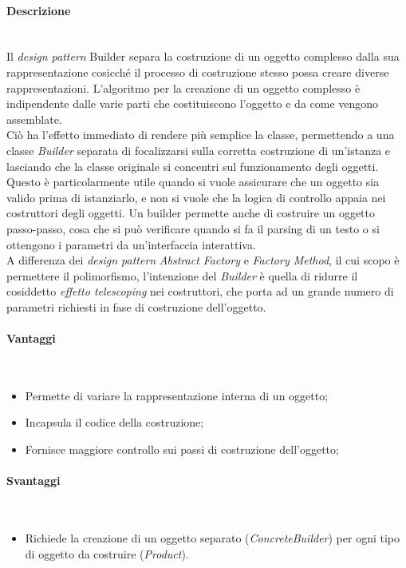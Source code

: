 \paragraph{Descrizione} \mbox{} \\
Il \textit{design pattern} Builder separa la costruzione di un oggetto complesso dalla sua rappresentazione cosicché il processo di costruzione stesso possa creare diverse rappresentazioni. L'algoritmo per la creazione di un oggetto complesso è indipendente dalle varie parti che costituiscono l'oggetto e da come vengono assemblate. \\
Ciò ha l'effetto immediato di rendere più semplice la classe, permettendo a una classe \textit{Builder} separata di focalizzarsi sulla corretta costruzione di un'istanza e lasciando che la classe originale si concentri sul funzionamento degli oggetti. Questo è particolarmente utile quando si vuole assicurare che un oggetto sia valido prima di istanziarlo, e non si vuole che la logica di controllo appaia nei costruttori degli oggetti. Un builder permette anche di costruire un oggetto passo-passo, cosa che si può verificare quando si fa il parsing di un testo o si ottengono i parametri da un'interfaccia interattiva. \\
A differenza dei \textit{design pattern} \textit{Abstract Factory} e \textit{Factory Method}, il cui scopo è permettere il polimorfismo, l'intenzione del \textit{Builder} è quella di ridurre il cosiddetto \textit{effetto telescoping} nei costruttori, che porta ad un grande numero di parametri richiesti in fase di costruzione dell'oggetto.
\paragraph{Vantaggi} \mbox{} \\
\begin{itemize}
\item Permette di variare la rappresentazione interna di un oggetto;
\item Incapsula il codice della costruzione;
\item Fornisce maggiore controllo sui passi di costruzione dell'oggetto;
\end{itemize}
\paragraph{Svantaggi} \mbox{} \\
\begin{itemize}
\item Richiede la creazione di un oggetto separato (\textit{ConcreteBuilder}) per ogni tipo di oggetto da costruire (\textit{Product}).
\end{itemize}
